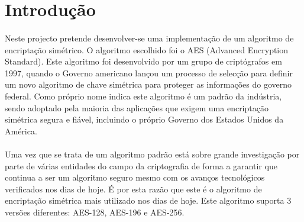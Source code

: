 \section{Introdução}

\paragraph{} Neste projecto pretende desenvolver-se uma implementação de um algoritmo de encriptação simétrico. O algoritmo escolhido foi o AES (Advanced Encryption Standard). Este algoritmo foi desenvolvido por um grupo de criptógrafos em 1997, quando o Governo americano lançou um processo de selecção para definir um novo algoritmo de chave simétrica para proteger as informações do governo federal. Como próprio nome indica este algoritmo é um padrão da indústria, sendo adoptado pela maioria das aplicações que exigem uma encriptação simétrica segura e fiável, incluindo o próprio Governo dos Estados Unidos da América.

\paragraph{} Uma vez que se trata de um algoritmo padrão está sobre grande investigação por parte de várias entidades do campo da criptografia de forma a garantir que continua a ser um algoritmo seguro mesmo com os avanços tecnológicos verificados nos dias de hoje. É por esta razão que este é o algoritmo de encriptação simétrica mais utilizado nos dias de hoje.
Este algoritmo suporta 3 versões diferentes: AES-128, AES-196 e AES-256.
